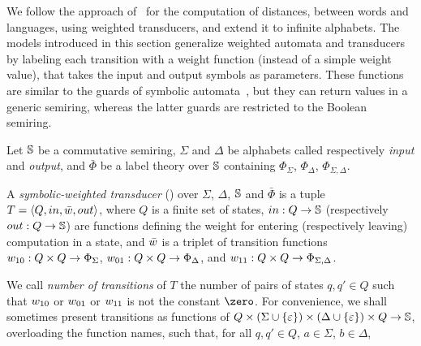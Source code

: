 We follow the approach of~\cite{Mohri03EDWA} for the computation of distances,
between words and languages, using weighted transducers, 
and extend it to infinite alphabets.
%
The models introduced in this section generalize 
weighted automata and transducers~\cite{Droste09handbook} 
by labeling each transition with a weight function (instead of a simple weight value), 
that takes the input and output symbols as parameters. 
These functions are similar to the guards of symbolic automata~\cite{dAntoniVeanes17CAV,dAntoni21CACM},
but they can return values in a generic semiring, 
whereas the latter guards are restricted to the Boolean semiring.
%

\noindent 
Let $\mathbb{S}$ be a commutative semiring, 
$\Sigma$ and $\Delta$ be alphabets called respectively \emph{input} and \emph{output}, %
and $\bar\Phi$ be a label theory over $\mathbb{S}$
containing $\Phi_\Sigma$, $\Phi_\Delta$, $\Phi_{\Sigma, \Delta}$.

\begin{definition}
\label{def:transducer} \label{def:SWT}
A \emph{symbolic-weighted transducer} (\SWT)
over $\Sigma$, $\Delta$, $\mathbb{S}$ and $\bar\Phi$
is a tuple
$T = \< Q, \init, \bar{\wei}, \final >$,
where $Q$ is a finite set of states, 
$\mathsf{in} : Q \to \Semiring$   %
(respectively $\mathsf{out} : Q \to \Semiring$)  %
are functions defining the weight for entering
(respectively leaving) computation in a state,  
and $\bar{\wei}$ is a triplet of transition functions 
$\wei_{10}: Q \times Q \to \Phi_{\Sigma}$,
$\wei_{01}: Q \times Q \to \Phi_{\Delta}$, and 
$\wei_{11}: Q \times Q \to \Phi_{\Sigma, \Delta}$.
\end{definition}
%
\noindent
We call \emph{number of transitions} of $T$ the number of pairs of states 
$q, q' \in Q$ such that $\wei_{10}$ or $\wei_{01}$ or $\wei_{11}$
is not the constant $\zero$.
%
\noindent
For convenience, we shall sometimes present transitions 
as functions of  
$Q \times (\Sigma \cup \{ \varepsilon \}) \times (\Delta \cup \{ \varepsilon \}) \times Q \to \mathbb{S}$,
overloading the function names,
such that, for all $q, q' \in Q$, $a \in \Sigma$,  $b \in \Delta$, 

